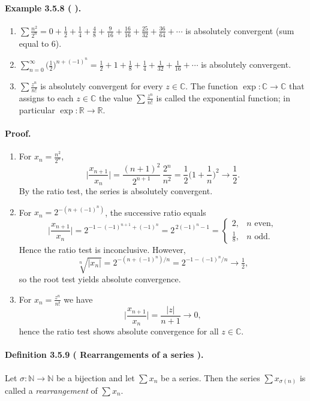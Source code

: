 \documentclass[12pt]{article}
\newcommand{\N}{\mathbb{N}}
\newcommand{\R}{\mathbb{R}}
\newcommand{\C}{\mathbb{C}}
\newcommand{\NumberedDefinition}[3]{%
\paragraph*{Definition #1 ( #2 ).} #3\par}
\newcommand{\NumberedExample}[3]{%
\paragraph*{Example #1 ( #2 ).} #3\par}
\begin{document}
\NumberedExample{3.5.8}{}{\begin{enumerate}[label={(\arabic*)}, leftmargin=*]
	\item $\displaystyle \sum \frac{n^2}{2^n} = 0 + \frac12 + \frac14 + \frac{4}{8} + \frac{9}{16} + \frac{16}{16} + \frac{25}{32} + \frac{36}{64} + \cdots$ is absolutely convergent (sum equal to $6$).
	\item $\displaystyle \sum_{n=0}^{\infty} \Big(\tfrac12\Big)^{n+(-1)^n} = \tfrac12 + 1 + \tfrac18 + \tfrac14 + \tfrac{1}{32} + \tfrac{1}{16} + \cdots$ is absolutely convergent.
	\item $\displaystyle \sum \frac{z^n}{n!}$ is absolutely convergent for every $z\in\C$. The function $\exp:\C\to\C$ that assigns to each $z\in\C$ the value $\sum \tfrac{z^n}{n!}$ is called the exponential function; in particular $\exp: \R\to\R$.
\end{enumerate}}

\paragraph{Proof.}
\begin{enumerate}[label={(\arabic*)}, leftmargin=*]
	\item For $x_n=\tfrac{n^2}{2^n}$,
	\[
		\Bigg|\frac{x_{n+1}}{x_n}\Bigg| = \frac{(n+1)^2}{2^{n+1}}\,\frac{2^n}{n^2} = \frac12\Big(1+\frac{1}{n}\Big)^2 \longrightarrow \frac12.
	\]
	By the ratio test, the series is absolutely convergent.
	\item For $x_n = 2^{-(n+(-1)^n)}$, the successive ratio equals
	\[
		\Bigg|\frac{x_{n+1}}{x_n}\Bigg| = 2^{-1 - (-1)^{n+1} + (-1)^n} = 2^{\,2(-1)^n-1} =
		\begin{cases}
			2, & n \text{ even},\\[2pt]
				\frac{1}{8}, & n \text{ odd}.
		\end{cases}
	\]
	Hence the ratio test is inconclusive. However,
	\[
		\sqrt[n]{|x_n|} = 2^{-(n+(-1)^n)/n} = 2^{-1 - (-1)^n/n} \longrightarrow \tfrac12,
	\]
	so the root test yields absolute convergence.
	\item For $x_n = \tfrac{z^n}{n!}$ we have
	\[
		\Bigg|\frac{x_{n+1}}{x_n}\Bigg| = \frac{|z|}{n+1} \longrightarrow 0,
	\]
	hence the ratio test shows absolute convergence for all $z\in\C$.
\end{enumerate}

	\NumberedDefinition{3.5.9}{Rearrangements of a series}{Let $\sigma:\N\to\N$ be a bijection and let $\sum x_n$ be a series. Then the series $\sum x_{\sigma(n)}$ is called a \emph{rearrangement} of $\sum x_n$.}
\end{document}
